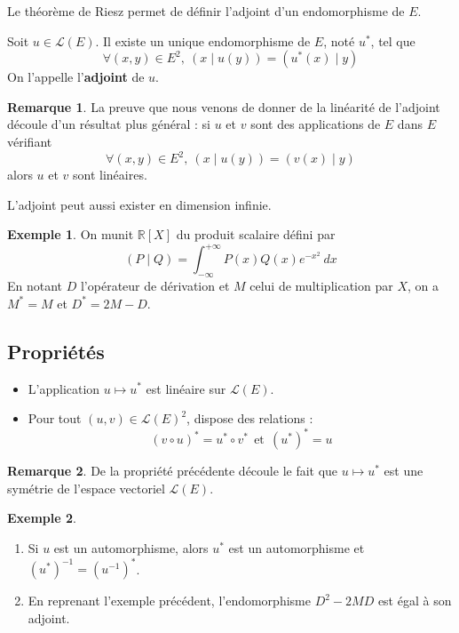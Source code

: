 \documentclass[french]{article}
\newcommand{\R}{\mathbb{R}}
\newcommand{\st}{^*}
\newcommand{\inv}{^{-1}}
\theoremstyle{plain}
\theoremstyle{definition}
\newtheorem*{ex}{Exemple}
\newtheorem*{rmq}{Remarque}
\theoremstyle{remark}
\begin{document}
Le théorème de Riesz permet de définir l'adjoint d'un endomorphisme de $E$.

\begin{thm}
	Soit $u\in\mathcal{L}(E)$. Il existe un unique endomorphisme de $E$, noté $u\st$, tel que $$\forall (x,y)\in E^2,\ (x\mid u(y))=(u\st(x)\mid y)$$ On l'appelle l'\textbf{adjoint} de $u$.
\end{thm}

\begin{rmq}
	La preuve que nous venons de donner de la linéarité de l'adjoint découle d'un résultat plus général : si $u$ et $v$ sont des applications de $E$ dans $E$ vérifiant $$\forall (x,y)\in E^2,\ (x\mid u(y))=(v(x)\mid y)$$ alors $u$ et $v$ sont linéaires.
\end{rmq}

L'adjoint peut aussi exister en dimension infinie.
\begin{ex}
	On munit $\R[X]$ du produit scalaire défini par $$(P\mid Q)=\int_{-\infty}^{+\infty}P(x)Q(x)e^{-x^2}\ dx$$ En notant $D$ l'opérateur de dérivation et $M$ celui de multiplication par $X$, on a $M\st=M$ et $D\st=2M-D$.
\end{ex}

\subsection{Propriétés}

\begin{prop}
	\begin{itemize}
		\item L'application $u\mapsto u\st$ est linéaire sur $\mathcal{L}(E)$.
		\item Pour tout $(u,v)\in \mathcal{L}(E)^2$, dispose des relations : $$(v\circ u)\st=u\st\circ v\st \ \ \text{et}\ \ (u\st)\st=u$$
	\end{itemize}
\end{prop}

\begin{rmq}
	De la propriété précédente découle le fait que $u\mapsto u\st$ est une symétrie de l'espace vectoriel $\mathcal{L}(E)$.
\end{rmq}

\begin{ex}
	\begin{enumerate}
		\item Si $u$ est un automorphisme, alors $u\st$ est un automorphisme et $(u\st)\inv=(u\inv)\st$.
		\item En reprenant l'exemple précédent, l'endomorphisme $D^2-2MD$ est égal à son adjoint.
	\end{enumerate}
\end{ex}
\end{document}
